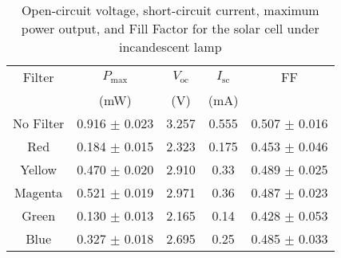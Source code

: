 \begin{table}[H]
    \centering
    \begin{tabular}{|c|c|c|c|c|}
    \hline
    Filter & $P_\text{max}$ & $V_\text{oc}$ & $I_\text{sc}$ & FF \\
     & (mW) & (V) & (mA) &  \\ \hline   
    No Filter & 0.916 $\pm$ 0.023 & 3.257 & 0.555 & 0.507 $\pm$ 0.016\\ 
    Red & 0.184 $\pm$ 0.015 & 2.323 & 0.175 & 0.453 $\pm$ 0.046\\ 
    Yellow & 0.470 $\pm$ 0.020 & 2.910 & 0.33 & 0.489 $\pm$ 0.025\\ 
    Magenta & 0.521 $\pm$ 0.019 & 2.971 & 0.36 & 0.487 $\pm$ 0.023\\ 
    Green & 0.130 $\pm$ 0.013 & 2.165 & 0.14 & 0.428 $\pm$ 0.053\\ 
    Blue & 0.327 $\pm$ 0.018 & 2.695 & 0.25 & 0.485 $\pm$ 0.033\\ \hline
    \end{tabular}
    \caption{Open-circuit voltage, short-circuit current,
    maximum power output, and Fill Factor for the solar
    cell under incandescent lamp}
    \label{in_all}
\end{table}